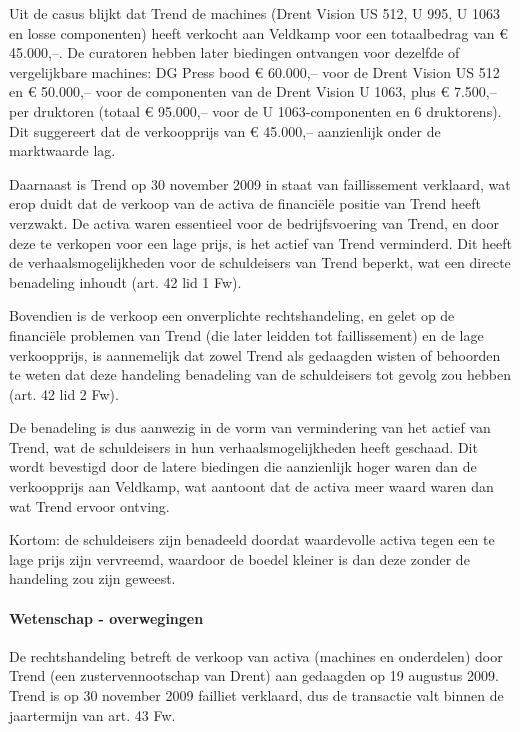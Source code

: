 \documentclass[
  dutch,
  a4paper,
]{article}
\begin{document}
Uit de casus blijkt dat Trend de machines (Drent Vision US 512, U 995, U 1063 en losse componenten) heeft verkocht aan Veldkamp voor een totaalbedrag van € 45.000,--. De curatoren hebben later biedingen ontvangen voor dezelfde of vergelijkbare machines: DG Press bood € 60.000,-- voor de Drent Vision US 512 en € 50.000,-- voor de componenten van de Drent Vision U 1063, plus € 7.500,-- per druktoren (totaal € 95.000,-- voor de U 1063-componenten en 6 druktorens). Dit suggereert dat de verkoopprijs van € 45.000,-- aanzienlijk onder de marktwaarde lag.

Daarnaast is Trend op 30 november 2009 in staat van faillissement verklaard, wat erop duidt dat de verkoop van de activa de financiële positie van Trend heeft verzwakt. De activa waren essentieel voor de bedrijfsvoering van Trend, en door deze te verkopen voor een lage prijs, is het actief van Trend verminderd. Dit heeft de verhaalsmogelijkheden voor de schuldeisers van Trend beperkt, wat een directe benadeling inhoudt (art. 42 lid 1 Fw).

Bovendien is de verkoop een onverplichte rechtshandeling, en gelet op de financiële problemen van Trend (die later leidden tot faillissement) en de lage verkoopprijs, is aannemelijk dat zowel Trend als gedaagden wisten of behoorden te weten dat deze handeling benadeling van de schuldeisers tot gevolg zou hebben (art. 42 lid 2 Fw).

De benadeling is dus aanwezig in de vorm van vermindering van het actief van Trend, wat de schuldeisers in hun verhaalsmogelijkheden heeft geschaad. Dit wordt bevestigd door de latere biedingen die aanzienlijk hoger waren dan de verkoopprijs aan Veldkamp, wat aantoont dat de activa meer waard waren dan wat Trend ervoor ontving.

Kortom: de schuldeisers zijn benadeeld doordat waardevolle activa tegen een te lage prijs zijn vervreemd, waardoor de boedel kleiner is dan deze zonder de handeling zou zijn geweest.

\paragraph{Wetenschap - overwegingen}\label{wetenschap---overwegingen-66}

De rechtshandeling betreft de verkoop van activa (machines en onderdelen) door Trend (een zustervennootschap van Drent) aan gedaagden op 19 augustus 2009. Trend is op 30 november 2009 failliet verklaard, dus de transactie valt binnen de jaartermijn van art. 43 Fw.
\end{document}

